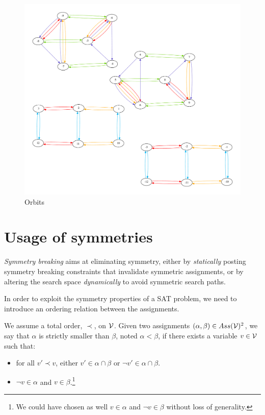  \begin{figure}[h]
 	\centering
 		\includegraphics[width=\textwidth]{cnfs/orbits}
 	\caption{Orbits}
 	\label{fig:orbits}
 \end{figure}



\section{Usage of symmetries}

\emph{Symmetry breaking} aims at eliminating symmetry, either
by \emph{statically} posting symmetry breaking constraints that invalidate symmetric
assignments, or by altering the search space \emph{dynamically} to avoid symmetric search paths.


In order to exploit the symmetry properties of a SAT problem, we need to
introduce an ordering relation between the assignments.


\begin{definition}
	\label{def:assignment_ordering}
	We assume a total order, $\prec$, on $\mathcal{V}$.  Given two assignments $(\alpha,\beta) \in Ass(\mathcal{V})^2 $, we say that $\alpha$ is strictly smaller than $\beta$, noted $\alpha < \beta$, if there exists a variable $v \in \mathcal{V}$
	such that:
	\begin{itemize}
		\item for all $v' \prec v$, either $v' \in \alpha \cap \beta$ or $\neg v' \in \alpha \cap
		\beta$.
		\item $\neg v \in \alpha$ and $v \in \beta$.\footnote{We could have chosen as well $v \in \alpha$ and $\neg v \in \beta$ without loss of generality.}
	\end{itemize}
\end{definition}

